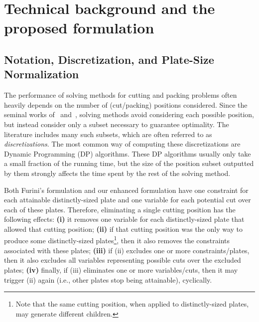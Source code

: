 \documentclass[ppgc,tese,english,formais,babel]{iiufrgs}
\begin{document}

\chapter{Technical background and the proposed formulation}
\section{Notation, Discretization, and Plate-Size Normalization}
\label{sec:psn}

The performance of solving methods for cutting and packing problems often heavily depends on the number of (cut/packing) positions considered.
Since the seminal works of~\citet{cw:1977} and~\citet{herz:1972}, solving methods avoid considering each possible position, but instead consider only a subset necessary to guarantee optimality.
The literature includes many such subsets, which are often referred to as \emph{discretizations}.
The most common way of computing these discretizations are Dynamic Programming (DP) algorithms.
These DP algorithms usually only take a small fraction of the running time, but the size of the position subset outputted by them strongly affects the time spent by the rest of the solving method.

Both Furini's formulation and our enhanced formulation have one constraint for each attainable distinctly-sized plate and one variable for each potential cut over each of these plates.
Therefore, eliminating a single cutting position has the following effects:
\textbf{(i)} it removes one variable for each distinctly-sized plate that allowed that cutting position;
\textbf{(ii)} if that cutting position was the only way to produce some distinctly-sized plates\footnote{Note that the same cutting position, when applied to distinctly-sized plates, may generate different children.}, then it also removes the constraints associated with these plates;
\textbf{(iii)} if (ii) excludes one or more constraints/plates, then it also excludes all variables representing possible cuts over the excluded plates;
\textbf{(iv)} finally, if (iii) eliminates one or more variables/cuts, then it may trigger (ii) again (i.e., other plates stop being attainable), cyclically.
\end{document}
